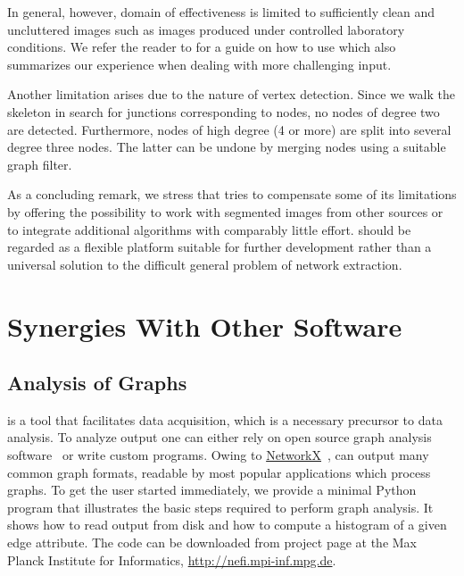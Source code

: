 		In general, however, \NEFIs domain of effectiveness is limited to sufficiently clean and uncluttered images such as images produced under controlled laboratory conditions. We refer the reader to  for a guide on how to use \NEFI which also summarizes our experience when dealing with more challenging input.

		Another limitation arises due to the nature of \NEFIs vertex detection. Since we walk the skeleton in search for junctions corresponding to nodes, no nodes of degree two are detected. Furthermore, nodes of high degree (4 or more) are split into several degree three nodes. The latter can be undone by merging nodes using a suitable graph filter.

		As a concluding remark, we stress that \NEFI tries to compensate some of its limitations by offering the possibility to work with segmented images from other sources or to integrate additional algorithms with comparably little effort. \NEFI should be regarded as a flexible platform suitable for further development rather than a universal solution to the difficult general problem of network extraction. 

\section{Synergies With Other Software}

	\subsection{Analysis of Graphs}

		\NEFI is a tool that facilitates data acquisition, which is a necessary precursor to data analysis. To analyze \NEFIs output one can either rely on open source graph analysis software~\cite{ICWSM09154,snap,batagelj1998pajek,5437689,loscalzo2008social,networkx} or write custom programs. Owing to \href{https://networkx.github.io/documentation/latest/index.html}{NetworkX}~\cite{networkx}, \NEFI can output many common graph formats, readable by most popular applications which process graphs. To get the user started immediately, we provide a minimal Python program that illustrates the basic steps required to perform graph analysis. It shows how to read \NEFIs output from disk and how to compute a histogram of a given edge attribute. The code can be downloaded from \NEFIs project page at the Max Planck Institute for Informatics, \href{http://nefi.mpi-inf.mpg.de}{http://nefi.mpi-inf.mpg.de}.


